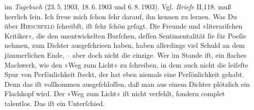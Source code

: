 \begin{ledgroupsized}[t]{13cm}
{{{                  im \emph{Tagebuch} (23. 5. 1903, 18. 6. 1903 und 6. 8. 1903). Vgl. \emph{Briefe} II,118. }}}\label{K_L03204-2h} muß herrlich ſein. Ich freue mich
               ſchon ſehr darauf, ihn kennen zu lernen. {\pb}Was Du
               über \textsc{Hirschfeld} ſchreibſt, iſt ſehr ſchön geſagt. Die Freunde und »literariſchen Kritiker«, die
               den unentwickelten Burſchen,
               deſſen Sentimentalität ſie für Poeſie nehmen, zum Dichter ausgeſchrieen haben, haben
               allerdings viel Schuld an dem jämmerlichen Ende, – aber doch nicht die einzige. Wer
               im Stande iſt, ein flaches Machwerk, wie den »Weg
                  zum Licht« zu ſchreiben, in dem auch nicht die leiſeſte Spur von
               Perſönlichkeit ſteckt, der hat eben niemals eine Perſönlichkeit gehabt. Denn das iſt
               vollkommen ausgeſchloſſen, daß man aus einem Dichter {\pb}plötzlich ein Flachkopf wird. Der »Weg zum
                  Licht« iſt nicht verfehlt, ſondern complet talentlos. Das iſt ein
               Unterſchied.\pend
           \pstart

\end{ledgroupsized}

